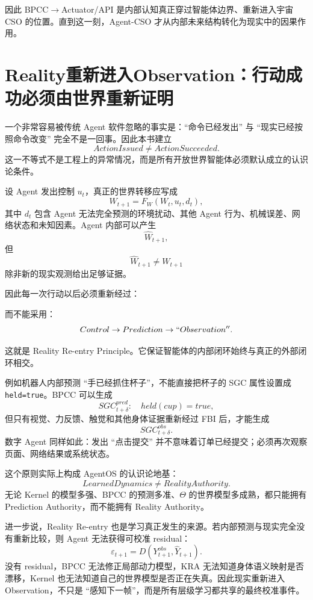 因此 BPCC$\rightarrow$Actuator/API 是内部认知真正穿过智能体边界、重新进入宇宙 CSO 的位置。直到这一刻，Agent-CSO 才从内部未来结构转化为现实中的因果作用。


\section{Reality重新进入Observation：行动成功必须由世界重新证明}

一个非常容易被传统 Agent 软件忽略的事实是：``命令已经发出'' 与 ``现实已经按照命令改变'' 完全不是一回事。因此本书建立
\[
\boxed{
ActionIssued\neq ActionSucceeded .
}
\]
这一不等式不是工程上的异常情况，而是所有开放世界智能体必须默认成立的认识论条件。

设 Agent 发出控制 $u_t$，真正的世界转移应写成
\[
W_{t+1}
=
F_W
\left(
W_t,
u_t,
d_t
\right),
\]
其中 $d_t$ 包含 Agent 无法完全预测的环境扰动、其他 Agent 行为、机械误差、网络状态和未知因素。Agent 内部可以产生
\[
\hat W_{t+1},
\]
但
\[
\hat W_{t+1}\neq W_{t+1}
\]
除非新的现实观测给出足够证据。

因此每一次行动以后必须重新经过：
\begin{statementbox}
\centering
{}
\end{statementbox}
而不能采用：
\[
Control
\rightarrow
Prediction
\rightarrow
``Observation'' .
\]

这就是 Reality Re-entry Principle。它保证智能体的内部闭环始终与真正的外部闭环相交。

例如机器人内部预测 ``手已经抓住杯子''，不能直接把杯子的 SGC 属性设置成 \texttt{held=true}。BPCC 可以生成
\[
SGC^{pred}_{t+\delta}:
\quad held(cup)=true ,
\]
但只有视觉、力反馈、触觉和其他身体证据重新经过 FBI 后，才能生成
\[
SGC^{obs}_{t+\delta} .
\]
数字 Agent 同样如此：发出 ``点击提交'' 并不意味着订单已经提交；必须再次观察页面、网络结果或系统状态。

这个原则实际上构成 AgentOS 的认识论地基：
\[
\boxed{
LearnedDynamics\neq RealityAuthority .
}
\]
无论 Kernel 的模型多强、BPCC 的预测多准、$\Theta$ 的世界模型多成熟，都只能拥有 Prediction Authority，而不能拥有 Reality Authority。

进一步说，Reality Re-entry 也是学习真正发生的来源。若内部预测与现实完全没有重新比较，则 Agent 无法获得可校准 residual：
\[
\varepsilon_{t+1}
=
D
\left(
Y^{obs}_{t+1},
\hat Y_{t+1}
\right).
\]
没有 residual，BPCC 无法修正局部动力模型，KRA 无法知道身体语义映射是否漂移，Kernel 也无法知道自己的世界模型是否正在失真。因此现实重新进入 Observation，不只是 ``感知下一帧''，而是所有层级学习都共享的最终校准事件。

